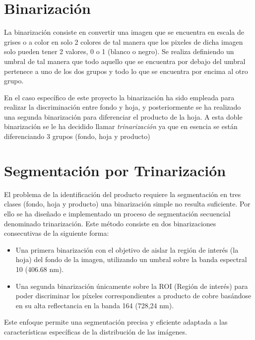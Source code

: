 \section{Binarización}
 
 La binarización \cite{SAUVOLA2000225} consiste en convertir una imagen que se encuentra en escala de grises o a color en solo 2 colores de tal manera que los pixeles de dicha imagen solo pueden tener 2 valores, 0 o 1 (blanco o negro). Se realiza definiendo un umbral de tal manera que todo aquello que se encuentra por debajo del umbral pertenece a uno de los dos grupos y todo lo que se encuentra por encima al otro grupo.
 

 En el caso específico de este proyecto la binarización ha sido empleada para realizar la discriminación entre fondo y hoja, y posteriormente se ha realizado una segunda binarización para diferenciar el producto de la hoja. A esta doble binarización se le ha decidido llamar \textit{trinarización} ya que en esencia se están diferenciando 3 grupos (fondo, hoja y producto)

 
\section{Segmentación por Trinarización}

El problema de la identificación del producto requiere la segmentación en tres clases (fondo, hoja y producto) una binarización simple no resulta suficiente. Por ello se ha diseñado e implementado un proceso de segmentación secuencial denominado trinarización. Este método consiste en dos binarizaciones consecutivas de la siguiente forma:
\begin{itemize}

\item Una primera binarización con el objetivo de aislar la región de interés (la hoja) del fondo de la imagen, utilizando un umbral sobre la banda espectral 10 (406.68 nm).
\item Una segunda binarización únicamente sobre la ROI (Región de interés) para poder discriminar los píxeles correspondientes a producto de cobre basándose en su alta reflectancia en la banda 164 (728,24 nm)\cite{SANCHEZ2025101049}.
\end{itemize}
Este enfoque permite una segmentación precisa y eficiente adaptada a las características específicas de la distribución de las imágenes.


